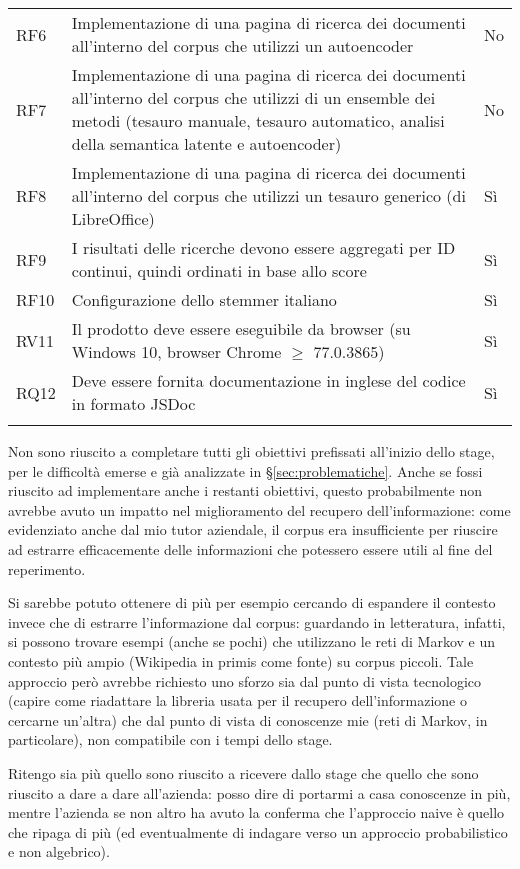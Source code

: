 \begin{longtable}{lp{}p{}}
        RF6 & Implementazione di una pagina di ricerca dei documenti all'interno del corpus che utilizzi un autoencoder & No\\ \addlinespace
        RF7 & Implementazione di una pagina di ricerca dei documenti all'interno del corpus che utilizzi di un ensemble dei metodi (tesauro manuale, tesauro automatico, analisi della semantica latente e autoencoder) & No\\ \addlinespace
        RF8 & Implementazione di una pagina di ricerca dei documenti all'interno del corpus che utilizzi un tesauro generico (di LibreOffice) & Sì\\ \addlinespace
        RF9 & I risultati delle ricerche devono essere aggregati per ID continui, quindi ordinati in base allo score & Sì \\ \addlinespace
        RF10 & Configurazione dello stemmer italiano & Sì \\ \addlinespace
        RV11 & Il prodotto deve essere eseguibile da browser (su Windows 10, browser Chrome $\geq$ 77.0.3865) & Sì \\ \addlinespace
        RQ12 & Deve essere fornita documentazione in inglese del codice in formato JSDoc & Sì \\ \addlinespace
\label{tabella:requisitiCompletati}
\end{longtable}
Non sono riuscito a completare tutti gli obiettivi prefissati all'inizio dello stage,
per le difficoltà emerse e già analizzate in §\ref{sec:problematiche}.
Anche se fossi riuscito ad implementare anche i restanti obiettivi, questo probabilmente
non avrebbe avuto un impatto nel miglioramento del recupero dell'informazione:
come evidenziato anche dal mio tutor aziendale, il corpus era insufficiente
per riuscire ad estrarre efficacemente delle informazioni che potessero essere utili 
al fine del reperimento.

Si sarebbe potuto ottenere di più per esempio cercando di espandere il contesto
invece che di estrarre l'informazione dal corpus: guardando in letteratura,
infatti, si possono trovare esempi (anche se pochi) che utilizzano le reti di Markov
e un contesto più ampio (Wikipedia in primis come fonte) su corpus piccoli. 
Tale approccio però avrebbe richiesto uno sforzo sia dal punto di vista tecnologico (capire
come riadattare la libreria usata per il recupero dell'informazione o cercarne 
un'altra) che dal punto di vista di conoscenze mie (reti di Markov, in particolare),
non compatibile con i tempi dello stage. 

Ritengo sia più quello sono riuscito a ricevere dallo stage che quello che sono riuscito a dare a dare all'azienda: posso dire di portarmi a casa conoscenze in più, mentre l'azienda se non altro ha avuto la conferma che l'approccio naive è quello che ripaga di più (ed eventualmente di indagare verso un approccio probabilistico e non algebrico).

